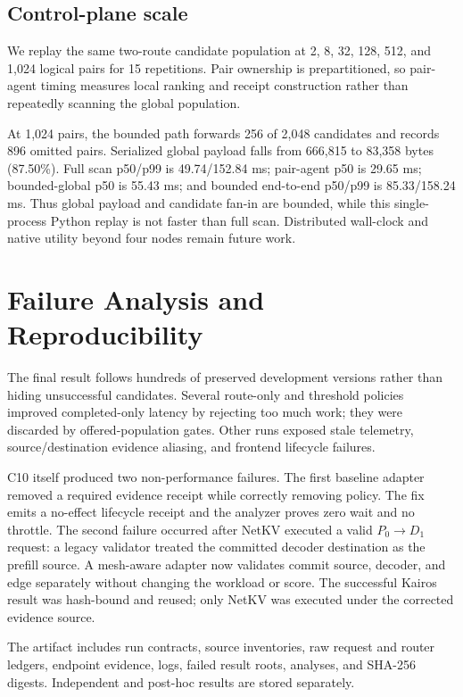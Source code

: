 \documentclass[10pt,twocolumn]{article}
\begin{document}
\subsection{Control-plane scale}
\label{sec:scale}

We replay the same two-route candidate population at 2, 8, 32, 128, 512, and
1,024 logical pairs for 15 repetitions.  Pair ownership is prepartitioned, so
pair-agent timing measures local ranking and receipt construction rather than
repeatedly scanning the global population.

At 1,024 pairs, the bounded path forwards 256 of 2,048 candidates and records
896 omitted pairs.  Serialized global payload falls from 666,815 to 83,358
bytes (87.50\%).  Full scan p50/p99 is 49.74/152.84 ms; pair-agent p50 is
29.65 ms; bounded-global p50 is 55.43 ms; and bounded end-to-end p50/p99 is
85.33/158.24 ms.  Thus global payload and candidate fan-in are bounded, while
this single-process Python replay is not faster than full scan.  Distributed
wall-clock and native utility beyond four nodes remain future work.

\section{Failure Analysis and Reproducibility}

The final result follows hundreds of preserved development versions rather
than hiding unsuccessful candidates.  Several route-only and threshold
policies improved completed-only latency by rejecting too much work; they were
discarded by offered-population gates.  Other runs exposed stale telemetry,
source/destination evidence aliasing, and frontend lifecycle failures.

C10 itself produced two non-performance failures.  The first baseline adapter
removed a required evidence receipt while correctly removing policy.  The fix
emits a no-effect lifecycle receipt and the analyzer proves zero wait and no
throttle.  The second failure occurred after NetKV executed a valid
$P_0\!\rightarrow\!D_1$ request: a legacy validator treated the committed
decoder destination as the prefill source.  A mesh-aware adapter now validates
commit source, decoder, and edge separately without changing the workload or
score.  The successful Kairos result was hash-bound and reused; only NetKV was
executed under the corrected evidence source.

The artifact includes run contracts, source inventories, raw request and
router ledgers, endpoint evidence, logs, failed result roots, analyses, and
SHA-256 digests.  Independent and post-hoc results are stored separately.
\end{document}
